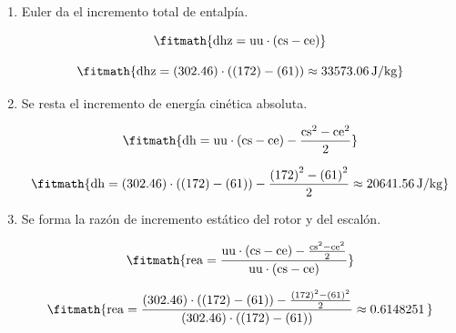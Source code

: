 \begin{enumerate}

\item Euler da el incremento total de entalpía.

\[\fitmath{\mathrm{dhz}=\mathrm{uu}\cdot \left(\mathrm{cs}-\mathrm{ce}\right)}\]

\[\fitmath{\mathrm{dhz}=(302.46)\cdot \left((172)-(61)\right)\approx 33573.06\,\mathrm{J/kg}}\]

\item Se resta el incremento de energía cinética absoluta.

\[\fitmath{\mathrm{dh}=\mathrm{uu}\cdot \left(\mathrm{cs}-\mathrm{ce}\right)-\frac{{\mathrm{cs}}^{2}-{\mathrm{ce}}^{2}}{2}}\]

\[\fitmath{\mathrm{dh}=(302.46)\cdot \left((172)-(61)\right)-\frac{{(172)}^{2}-{(61)}^{2}}{2}\approx 20641.56\,\mathrm{J/kg}}\]

\item Se forma la razón de incremento estático del rotor y del escalón.

\[\fitmath{\mathrm{rea}=\frac{\mathrm{uu}\cdot \left(\mathrm{cs}-\mathrm{ce}\right)-\frac{{\mathrm{cs}}^{2}-{\mathrm{ce}}^{2}}{2}}{\mathrm{uu}\cdot \left(\mathrm{cs}-\mathrm{ce}\right)}}\]

\[\fitmath{\mathrm{rea}=\frac{(302.46)\cdot \left((172)-(61)\right)-\frac{{(172)}^{2}-{(61)}^{2}}{2}}{(302.46)\cdot \left((172)-(61)\right)}\approx 0.6148251\,}\]

\end{enumerate}
